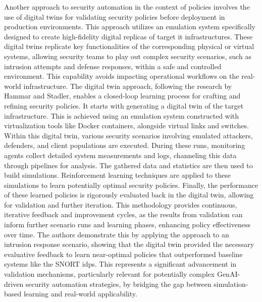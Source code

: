 Another approach to security automation in the context of policies involves the use of digital twins for validating security policies before deployment in production environments\cite{hammar_digital_2023}. This approach utilizes an emulation system specifically designed to create high-fidelity digital replicas of target \gls{it} infrastructures\cite{hammar_digital_2023}. These digital twins replicate key functionalities of the corresponding physical or virtual systems, allowing security teams to play out complex security scenarios, such as intrusion attempts and defense responses, within a safe and controlled environment\cite{hammar_digital_2023}. This capability avoids impacting operational workflows on the real-world infrastructure\cite{hammar_digital_2023}.
The digital twin approach, following the research by Hammar and Stadler, enables a closed-loop learning process for crafting and refining security policies\cite{hammar_digital_2023}. It starts with generating a digital twin of the target infrastructure. This is achieved using an emulation system constructed with virtualization tools like Docker containers, alongside virtual links and switches\cite{hammar_digital_2023}. Within this digital twin, various security scenarios involving emulated attackers, defenders, and client populations are executed\cite{hammar_digital_2023}. During these runs, monitoring agents collect detailed system measurements and logs, channeling this data through pipelines for analysis\cite{hammar_digital_2023}. The gathered data and statistics are then used to build simulations\cite{hammar_digital_2023}. Reinforcement learning techniques are applied to these simulations to learn potentially optimal security policies\cite{hammar_digital_2023}. Finally, the performance of these learned policies is rigorously evaluated back in the digital twin, allowing for validation and further iteration\cite{hammar_digital_2023}.
This methodology provides continuous, iterative feedback and improvement cycles, as the results from validation can inform further scenario runs and learning phases, enhancing policy effectiveness over time\cite{hammar_digital_2023}. The authors demonstrate this by applying the approach to an intrusion response scenario, showing that the digital twin provided the necessary evaluative feedback to learn near-optimal policies that outperformed baseline systems like the SNORT \gls{idps}\cite{zhou_study_2010}. This represents a significant advancement in validation mechanisms, particularly relevant for potentially complex GenAI-driven security automation strategies, by bridging the gap between simulation-based learning and real-world applicability\cite{hammar_digital_2023}.


